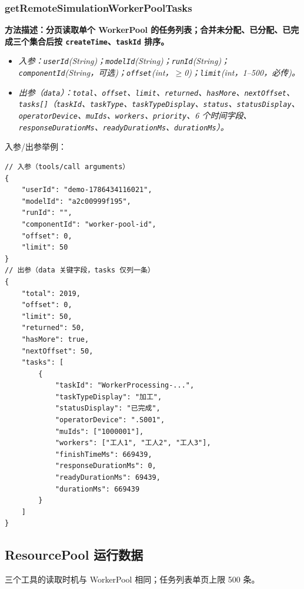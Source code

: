 \subsubsection{getRemoteSimulationWorkerPoolTasks}
\bf{方法描述}：分页读取单个 WorkerPool 的任务列表；合并未分配、已分配、已完成三个集合后按 \texttt{createTime}、\texttt{taskId} 排序。
\begin{itemize}
	\item \it{入参}：\texttt{userId}(String)；\texttt{modelId}(String)；\texttt{runId}(String)；\texttt{componentId}(String，可选)；\texttt{offset}(int，$\geq$0)；\texttt{limit}(int，1--500，必传)。
	\item \it{出参}（\texttt{data}）：\texttt{total}、\texttt{offset}、\texttt{limit}、\texttt{returned}、\texttt{hasMore}、\texttt{nextOffset}、\texttt{tasks[]}（\texttt{taskId}、\texttt{taskType}、\texttt{taskTypeDisplay}、\texttt{status}、\texttt{statusDisplay}、\texttt{operatorDevice}、\texttt{muIds}、\texttt{workers}、\texttt{priority}、6 个时间字段、\texttt{responseDurationMs}、\texttt{readyDurationMs}、\texttt{durationMs}）。
\end{itemize}
入参/出参举例：
\begin{lstlisting}
// 入参（tools/call arguments）
{
    "userId": "demo-1786434116021",
    "modelId": "a2c00999f195",
    "runId": "",
    "componentId": "worker-pool-id",
    "offset": 0,
    "limit": 50
}
// 出参（data 关键字段，tasks 仅列一条）
{
    "total": 2019,
    "offset": 0,
    "limit": 50,
    "returned": 50,
    "hasMore": true,
    "nextOffset": 50,
    "tasks": [
        {
            "taskId": "WorkerProcessing-...",
            "taskTypeDisplay": "加工",
            "statusDisplay": "已完成",
            "operatorDevice": ".S001",
            "muIds": ["1000001"],
            "workers": ["工人1", "工人2", "工人3"],
            "finishTimeMs": 669439,
            "responseDurationMs": 0,
            "readyDurationMs": 69439,
            "durationMs": 669439
        }
    ]
}
\end{lstlisting}\vspace{-30pt}

\subsection{ResourcePool 运行数据}
三个工具的读取时机与 WorkerPool 相同；任务列表单页上限 500 条。

